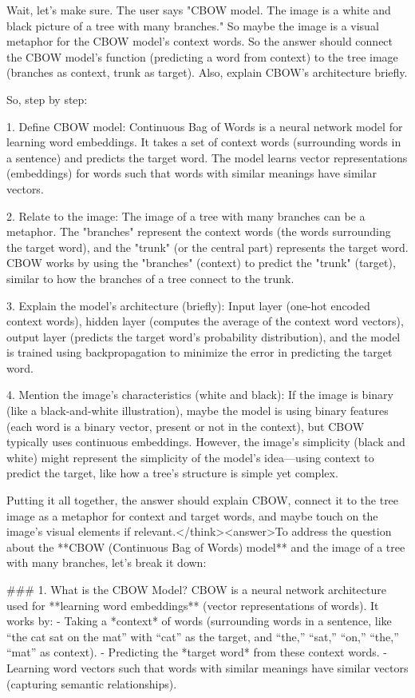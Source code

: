 Wait, let's make sure. The user says "CBOW model. The image is a white and black picture of a tree with many branches." So maybe the image is a visual metaphor for the CBOW model's context words. So the answer should connect the CBOW model's function (predicting a word from context) to the tree image (branches as context, trunk as target). Also, explain CBOW's architecture briefly.

So, step by step:

1. Define CBOW model: Continuous Bag of Words is a neural network model for learning word embeddings. It takes a set of context words (surrounding words in a sentence) and predicts the target word. The model learns vector representations (embeddings) for words such that words with similar meanings have similar vectors.

2. Relate to the image: The image of a tree with many branches can be a metaphor. The "branches" represent the context words (the words surrounding the target word), and the "trunk" (or the central part) represents the target word. CBOW works by using the "branches" (context) to predict the "trunk" (target), similar to how the branches of a tree connect to the trunk.

3. Explain the model's architecture (briefly): Input layer (one-hot encoded context words), hidden layer (computes the average of the context word vectors), output layer (predicts the target word's probability distribution), and the model is trained using backpropagation to minimize the error in predicting the target word.

4. Mention the image's characteristics (white and black): If the image is binary (like a black-and-white illustration), maybe the model is using binary features (each word is a binary vector, present or not in the context), but CBOW typically uses continuous embeddings. However, the image's simplicity (black and white) might represent the simplicity of the model's idea—using context to predict the target, like how a tree's structure is simple yet complex.

Putting it all together, the answer should explain CBOW, connect it to the tree image as a metaphor for context and target words, and maybe touch on the image's visual elements if relevant.</think><answer>To address the question about the **CBOW (Continuous Bag of Words) model** and the image of a tree with many branches, let’s break it down:  


### 1. What is the CBOW Model?  
CBOW is a neural network architecture used for **learning word embeddings** (vector representations of words). It works by:  
- Taking a *context* of words (surrounding words in a sentence, like “the cat sat on the mat” with “cat” as the target, and “the,” “sat,” “on,” “the,” “mat” as context).  
- Predicting the *target word* from these context words.  
- Learning word vectors such that words with similar meanings have similar vectors (capturing semantic relationships).  


